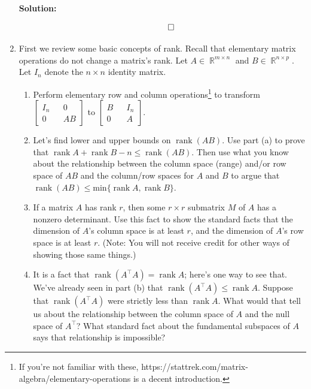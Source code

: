 \documentclass{article}
\DeclareMathOperator{\rank}{\mathrm{rank}}
\DeclareMathOperator{\R}{\mathbb{R}}
\newenvironment{solution}{\color{blue} \smallskip \textbf{Solution:}}{}
\begin{document}
\begin{enumerate}
\begin{solution}
\begin{enumerate}[(a)]
        \end{enumerate}
        \[ \qedhere \]

    \end{solution}

    \item 
    First we review some basic concepts of rank. 
    Recall that elementary matrix operations do not change a matrix's rank. 
    Let $A \in \R^{m \times n}$ and $B \in \R^{n \times p}$. 
    Let $I_n$ denote the $n \times n$ identity matrix.
    \begin{enumerate}
        \item
        Perform elementary row and column operations\footnote{
        If you're not familiar with these, https://stattrek.com/matrix-algebra/elementary-operations is a decent introduction.
        } to transform $\begin{bmatrix} I_n && 0 \\ 0 && AB \end{bmatrix}$ to $\begin{bmatrix} B && I_n \\ 0 && A \end{bmatrix}$.
     
        \item
        Let's find lower and upper bounds on $\rank(AB)$. 
        Use part (a) to prove that $\rank A+\rank B - n \leq \rank (AB)$.
        Then use what you know about the relationship between the column space (range) and/or row space of $AB$ and the column/row spaces for $A$ and $B$ to argue that $\rank (AB) \leq \text{min}\{\rank A,\rank B\}$.
    
        \item
        If a matrix $A$ has rank $r$, then some $r \times r$ submatrix $M$ of $A$ has a nonzero determinant.
        Use this fact to show the standard facts that the dimension of $A$'s column space is at least $r$, and the dimension of $A$'s row space is at least $r$.
        (Note: You will not receive credit for other ways of showing those same things.)
    
        \item
        It is a fact that $\rank (A^\top A) = \rank A$; here's one way to see that.
        We've already seen in part (b) that $\rank (A^\top A) \leq \rank A$.
        Suppose that $\rank (A^\top A)$ were strictly less than $\rank A$.
        What would that tell us about the relationship between the column space of $A$ and the null space of $A^\top$?
        What standard fact about the fundamental subspaces of $A$ says that relationship is impossible?
    

\end{enumerate}
\end{enumerate}
\end{document}
